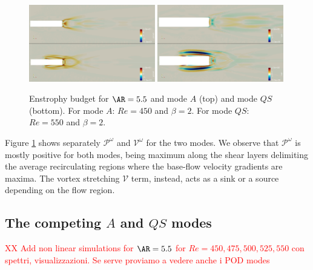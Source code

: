 \begin{figure}
  \centering
  \includegraphics[width=0.49\textwidth]{./fig/AR5p5/Prod_Re450_Re550_beta2_enst.png}
  \includegraphics[width=0.49\textwidth]{./fig/AR5p5/Vst_Re450_Re550_beta2_enst.png}
  \caption{Enstrophy budget for $\AR=5.5$ and mode $A$ (top) and mode $QS$ (bottom). For mode $A$: $Re=450$ and $\beta=2$. For mode $QS$: $Re=550$ and $\beta=2$.}
  \label{fig:enst_budget}
\end{figure}

Figure \ref{fig:enst_budget} shows separately $\mathcal{P}^\omega$ and $\mathcal{V}^\omega$ for the two modes. We observe that $\mathcal{P}^\omega$ is mostly positive for both modes, being maximum along the shear layers delimiting the average recirculating regions where the base-flow velocity gradients are maxima. The vortex stretching $\mathcal{V}$ term, instead, acts as a sink or a source depending on the flow region.
\fi

\subsection{The competing $A$ and $QS$ modes}

\textcolor{red}{XX Add non linear simulations for $\AR=5.5$ for $Re=450,475,500,525,550$ con spettri, visualizzazioni. Se serve proviamo a vedere anche i POD modes}


